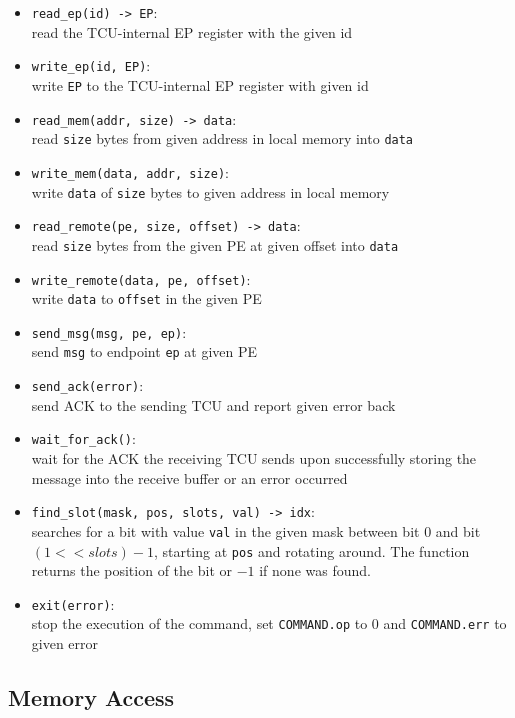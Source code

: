 \documentclass[a4paper,11pt,draft]{article}
\begin{document}
\begin{itemize}
  \item \texttt{read\_ep(id) -> EP}:\\
  read the TCU-internal EP register with the given id
  \item \texttt{write\_ep(id, EP)}:\\
  write \texttt{EP} to the TCU-internal EP register with given id
  \item \texttt{read\_mem(addr, size) -> data}:\\
  read \texttt{size} bytes from given address in local memory into \texttt{data}
  \item \texttt{write\_mem(data, addr, size)}:\\
  write \texttt{data} of \texttt{size} bytes to given address in local memory
  \item \texttt{read\_remote(pe, size, offset) -> data}:\\
  read \texttt{size} bytes from the given PE at given offset into \texttt{data}
  \item \texttt{write\_remote(data, pe, offset)}:\\
  write \texttt{data} to \texttt{offset} in the given PE
  \item \texttt{send\_msg(msg, pe, ep)}:\\
  send \texttt{msg} to endpoint \texttt{ep} at given PE
  \item \texttt{send\_ack(error)}:\\
  send ACK to the sending TCU and report given error back
  \item \texttt{wait\_for\_ack()}:\\
  wait for the ACK the receiving TCU sends upon successfully storing the message into the receive
  buffer or an error occurred
  \item \texttt{find\_slot(mask, pos, slots, val) -> idx}:\\
  searches for a bit with value \texttt{val} in the given mask between bit 0 and bit $(1 << slots) -
  1$, starting at \texttt{pos} and rotating around. The function returns the position of the bit or
  $-1$ if none was found.
  \item \texttt{exit(error)}:\\
  stop the execution of the command, set \texttt{COMMAND.op} to 0 and \texttt{COMMAND.err} to given error
\end{itemize}

\subsection{Memory Access}
\end{document}
